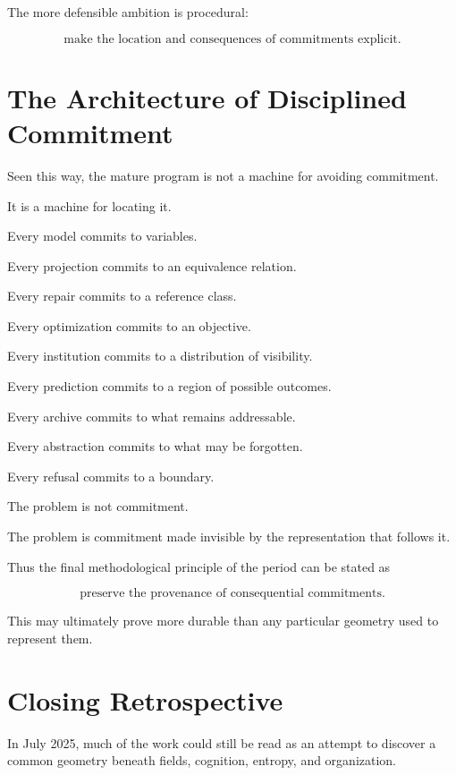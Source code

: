 \documentclass[11pt]{article}
\theoremstyle{remark}
\begin{document}
The more defensible ambition is procedural:

\begin{equation}
\boxed{
\text{make the location and consequences of commitments explicit}.
}
\end{equation}

\section{The Architecture of Disciplined Commitment}

Seen this way, the mature program is not a machine for avoiding commitment.

It is a machine for locating it.

Every model commits to variables.

Every projection commits to an equivalence relation.

Every repair commits to a reference class.

Every optimization commits to an objective.

Every institution commits to a distribution of visibility.

Every prediction commits to a region of possible outcomes.

Every archive commits to what remains addressable.

Every abstraction commits to what may be forgotten.

Every refusal commits to a boundary.

The problem is not commitment.

The problem is commitment made invisible by the representation that follows it.

Thus the final methodological principle of the period can be stated as

\begin{equation}
\boxed{
\text{preserve the provenance of consequential commitments}.
}
\end{equation}

This may ultimately prove more durable than any particular geometry used to
represent them.

\section{Closing Retrospective}

In July 2025, much of the work could still be read as an attempt to discover a
common geometry beneath fields, cognition, entropy, and organization.
\end{document}
